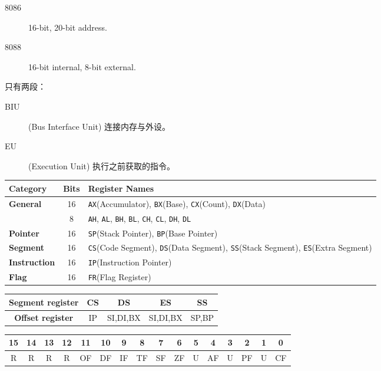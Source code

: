 % 
\begin{description}
\item[8086] 16-bit, 20-bit address.
\item[8088] 16-bit internal, 8-bit external.
\end{description}

只有两段：
\begin{description}
	\item[BIU](Bus Interface Unit) 连接内存与外设。
	\item[EU](Execution Unit) 执行之前获取的指令。
\end{description}

\begin{table*}
	\centering
	\caption{8086 寄存器}
	\begin{tabular}{|>{\bfseries}l|c|l|}
		\hline
		Category & \bfseries Bits &\bfseries Register Names \\
		\hline
		General & 16 & \texttt{AX}(Accumulator), \texttt{BX}(Base), \texttt{CX}(Count), \texttt{DX}(Data) \\
		\hline
		& 8 & \texttt{AH}, \texttt{AL}, \texttt{BH}, \texttt{BL}, \texttt{CH}, \texttt{CL}, \texttt{DH}, \texttt{DL} \\
		\hline
		Pointer & 16 & \texttt{SP}(Stack Pointer), \texttt{BP}(Base Pointer) \\
		\hline
		Segment & 16 & \texttt{CS}(Code Segment), \texttt{DS}(Data Segment), \texttt{SS}(Stack Segment), \texttt{ES}(Extra Segment) \\
		\hline
		Instruction & 16 & \texttt{IP}(Instruction Pointer) \\
		\hline
		Flag & 16 & \texttt{FR}(Flag Register) \\
		\hline
	\end{tabular}
	\caption{段偏移寄存器}
	\begin{tabular}{|>{\bfseries}c|>{\ttfamily}c|>{\ttfamily}c|>{\ttfamily}c|>{\ttfamily}c|}
		\hline
		Segment register & CS & DS & ES & SS \\
		\hline
		Offset register & IP & SI,DI,BX & SI,DI,BX & SP,BP \\
		\hline
	\end{tabular}
	\caption{Flag 寄存器}
	\ttfamily
	\begin{tabular}{|c|c|c|c|c|c|c|c|c|c|c|c|c|c|c|c|}
		\hline
		15 & 14 & 13 & 12 & 11 & 10 & 9 & 8 & 7 & 6 & 5 & 4 & 3 & 2 & 1 & 0 \\
		\hline
		R & R & R & R & OF & DF & IF & TF & SF & ZF & U & AF & U & PF & U & CF \\
		\hline
	\end{tabular}
\end{table*}

